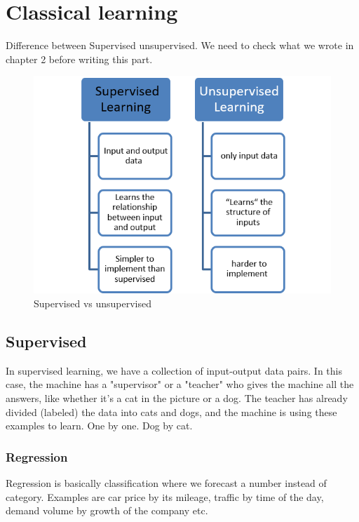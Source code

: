 \section{Classical learning}
Difference between Supervised unsupervised. We need to check what we wrote in chapter 2 before writing this part.
\begin{figure}[hbtp]
	\centering
	\includegraphics[scale=1]{Supervsunsuper1}
	\caption{Supervised vs unsupervised}
	\label{fig:Datensatz - unbearbeitet}
\end{figure}



\subsection{Supervised}

In supervised learning, we have a collection of input-output data pairs. In this case, the machine has a "supervisor" or a "teacher" who gives the machine all the answers, like whether it's a cat in the picture or a dog. The teacher has already divided (labeled) the data into cats and dogs, and the machine is using these examples to learn. One by one. Dog by cat. 


\subsubsection{Regression}
Regression is basically classification where we forecast a number instead of category. Examples are car price by its mileage, traffic by time of the day, demand volume by growth of the company etc.

